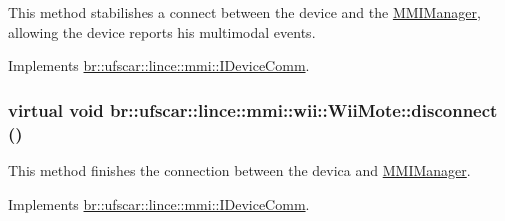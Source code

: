 This method stabilishes a connect between the device and the \hyperlink{classbr_1_1ufscar_1_1lince_1_1mmi_1_1MMIManager}{MMIManager}, allowing the device reports his multimodal events. 



Implements \hyperlink{classbr_1_1ufscar_1_1lince_1_1mmi_1_1IDeviceComm_a53f48993f294b9a755125b6ccdb06ad4}{br::ufscar::lince::mmi::IDeviceComm}.

\hypertarget{classbr_1_1ufscar_1_1lince_1_1mmi_1_1wii_1_1WiiMote_a44aa8cf98660392a91045e4892a9e65a}{
\subsubsection[{disconnect}]{\setlength{\rightskip}{0pt plus 5cm}virtual void br::ufscar::lince::mmi::wii::WiiMote::disconnect ()}}
\label{classbr_1_1ufscar_1_1lince_1_1mmi_1_1wii_1_1WiiMote_a44aa8cf98660392a91045e4892a9e65a}


This method finishes the connection between the devica and \hyperlink{classbr_1_1ufscar_1_1lince_1_1mmi_1_1MMIManager}{MMIManager}. 



Implements \hyperlink{classbr_1_1ufscar_1_1lince_1_1mmi_1_1IDeviceComm_ad3791cf1ab234f4a6b464c3f614c78c6}{br::ufscar::lince::mmi::IDeviceComm}.

